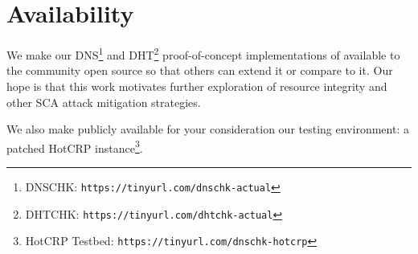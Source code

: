 \section{Availability} \label{sec:availability}

We make our DNS\footnote{DNSCHK: \texttt{https://tinyurl.com/dnschk-actual}} and
DHT\footnote{DHTCHK: \texttt{https://tinyurl.com/dhtchk-actual}}
proof-of-concept implementations of \SYSTEM{} available to the community open
source so that others can extend it or compare to it. Our hope is that this work
motivates further exploration of resource integrity and other SCA attack
mitigation strategies.

We also make publicly available for your consideration our testing environment:
a patched HotCRP instance\footnote{HotCRP Testbed:
\texttt{https://tinyurl.com/dnschk-hotcrp}}.
